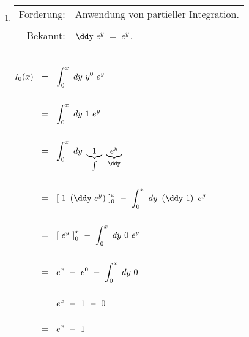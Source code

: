 \newpage




\section{~}

~\\

\begin{enumerate}[leftmargin=*, labelsep=2em, itemsep=3em, label=\alph*)]


	\item \hfill \break
	
	\begin{longtable}[l]{rl}
		
		Forderung:  &  Anwendung von partieller Integration. \\
		
		\\
		
		  Bekannt:  &  $\ddy ~ e^y ~ = ~ e^y$.
		
	\end{longtable}
	
	~\\ $\begin{aligned}[t]
		I_0(x) ~~ &= ~~ \int_{0}^{x} ~ dy ~ y^0 ~ e^y \\ \\
		&= ~~ \int_{0}^{x} ~ dy ~ 1 ~ e^y \\ \\
		&= ~~ \int_{0}^{x} ~ dy ~ \underbrace{1}_{ \int } ~ \underbrace{ e^y }_{ \ddy } \\ \\
		&= ~~ \left[ ~ 1 ~ \left( \ddy ~ e^y \right) ~ \right]_{0}^{x} ~ - ~ \int_{0}^{x} ~ dy ~ \left( \ddy ~ 1 \right) ~ e^y \\ \\
		&= ~~ \left[ ~ e^y ~ \right]_{0}^{x} ~ - ~ \int_{0}^{x} ~ dy ~ 0 ~ e^y \\ \\
		&= ~~ e^x ~ - ~ e^0 ~ - ~ \int_{0}^{x} ~ dy ~ 0 \\ \\
		&= ~~ e^x ~ - ~ 1 ~ - ~ 0 \\ \\
		&= ~~ e^x ~ - ~ 1 \\ \\
	\end{aligned}$
	
	\newpage
	


\end{enumerate}
